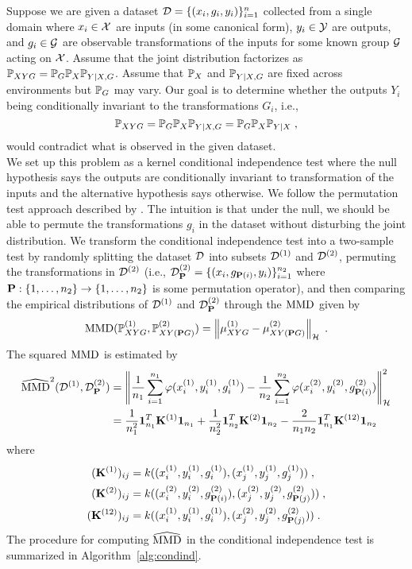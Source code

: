 Suppose we are given a dataset $\calD=\{(x_i,g_i,y_i)\}_{i=1}^n$ collected from a single domain where $x_i\in\calX$ are inputs (in some canonical form), $y_i\in\calY$ are outputs, and $g_i\in\calG$ are observable transformations of the inputs for some known group $\calG$ acting on $\calX$. Assume that the joint distribution factorizes as $\P_{XYG}=\P_G\P_X\P_{Y|X,G}$. Assume that $\bbP_X$ and $\bbP_{Y|X,G}$ are fixed across environments but $\bbP_G$ may vary. Our goal is to determine whether the outputs $Y_i$ being conditionally invariant to the transformations $G_i$, i.e.,
\[
\P_{XYG}=\P_G\P_X\P_{Y|X,G} = \P_G\P_X\P_{Y|X}\;,
\]
would contradict what is observed in the given dataset.
\\

We set up this problem as a kernel conditional independence test where the null hypothesis says the outputs are conditionally invariant to transformation of the inputs and the alternative hypothesis says otherwise. We follow the permutation test approach described by \textcite{Doran:2014}. The intuition is that under the null, we should be able to permute the transformations $g_i$ in the dataset without disturbing the joint distribution. We transform the conditional independence test into a two-sample test by randomly splitting the dataset $\calD$ into subsets $\calD^{(1)}$ and $\calD^{(2)}$, permuting the transformations in $\calD^{(2)}$ (i.e., $\calD_\bfP^{(2)}=\{(x_i,g_{\bfP(i)},y_i)\}_{i=1}^{n_2}$ where $\bfP:\{1,\ldots,n_2\}\rightarrow\{1,\ldots,n_2\}$ is some permutation operator), and then comparing the empirical distributions of $\calD^{(1)}$ and $\calD_\bfP^{(2)}$ through the $\MMD$ given by
\[
\MMD(\P_{XYG}^{(1)},\P_{XY(\bfP G)}^{(2)}) = \left\|\mu_{XYG}^{(1)}-\mu_{XY(\bfP G)}^{(2)}\right\|_\calH \;.
\]
The squared $\MMD$ is estimated by
\begin{align*}
\hatMMD^2(\calD^{(1)},\calD_\bfP^{(2)}) &= \left\|\frac{1}{n_1}\sum_{i=1}^{n_1}\varphi(\xo_i,\yo_i,\go_i) - \frac{1}{n_2}\sum_{i=1}^{n_2}\varphi(\xt_i,\yt_i,\gtw_{\bfP(i)})\right\|_\calH^2 \\
&= \frac{1}{n_1^2}\onevec_{n_1}^T\bfK^{(1)}\onevec_{n_1} + \frac{1}{n_2^2}\onevec_{n_2}^T\bfK^{(2)}\onevec_{n_2} - \frac{2}{n_1n_2}\onevec_{n_1}^T\bfK^{(12)}\onevec_{n_2}
\end{align*}
where
\begin{align*}
(\bfK^{(1)})_{ij} &= k((\xo_i,\yo_i,\go_i),(\xo_j,\yo_j,\go_j)) \;, \\
(\bfK^{(2)})_{ij} &= k((\xt_i,\yt_i,\gtw_{\bfP(i)}),(\xt_j,\yt_j,\gtw_{\bfP(j)})) \;, \\
(\bfK^{(12)})_{ij} &= k((\xo_i,\yo_i,\go_i),(\xt_j,\yt_j,\gtw_{\bfP(j)})) \;.
\end{align*}
The procedure for computing $\hatMMD$ in the conditional independence test is summarized in Algorithm~\ref{alg:condind}.
\\

